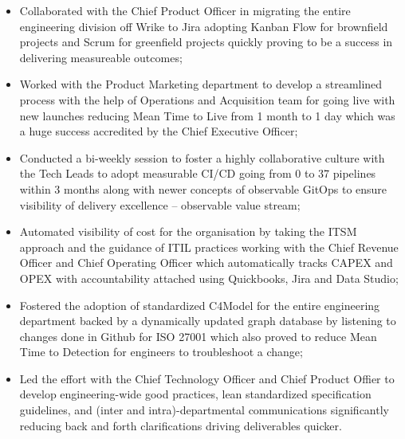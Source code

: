 \documentclass[11pt,a4paper,nolmodern,colorlinks=true,linkcolor=true]{moderncv}
\begin{document}
%
  {
    \begin{itemize}
      \item Collaborated with the Chief Product Officer in migrating the entire engineering division off Wrike to Jira adopting Kanban Flow for brownfield projects and Scrum for greenfield projects quickly proving to be a success in delivering measureable outcomes;
      \item Worked with the Product Marketing department to develop a streamlined process with the help of Operations and Acquisition team for going live with new launches reducing Mean Time to Live from 1 month to 1 day which was a huge success accredited by the Chief Executive Officer;
      \item Conducted a bi-weekly session to foster a highly collaborative culture with the Tech Leads to adopt measurable CI/CD going from 0 to 37 pipelines within 3 months along with newer concepts of observable GitOps to ensure visibility of delivery excellence -- observable value stream;
      \item Automated visibility of cost for the organisation by taking the ITSM approach and the guidance of ITIL practices working with the Chief Revenue Officer and Chief Operating Officer which automatically tracks CAPEX and OPEX with accountability attached using Quickbooks, Jira and Data Studio;
      \item Fostered the adoption of standardized C4Model for the entire engineering department backed by a dynamically updated graph database by listening to changes done in Github for ISO 27001 which also proved to reduce Mean Time to Detection for engineers to troubleshoot a change;
      \item Led the effort with the Chief Technology Officer and Chief Product Offier to develop engineering-wide good practices, lean standardized specification guidelines, and (inter and intra)-departmental communications significantly reducing back and forth clarifications driving deliverables quicker.
    \end{itemize}
}
\end{document}
